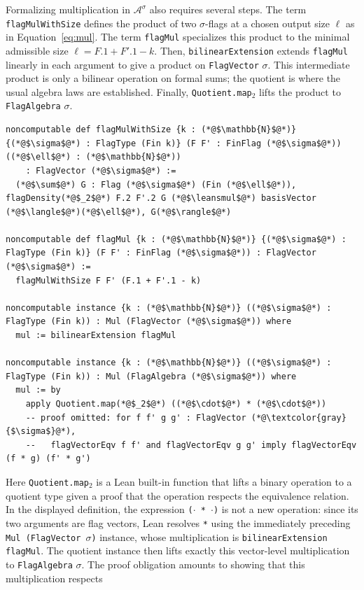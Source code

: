 \documentclass{article}
\newcommand{\lean}[1]{\texttt{#1}}
\newcommand{\leansmul}{\mathbin{\vcenter{\hbox{$\scriptstyle\bullet$}}}}
\begin{document}
Formalizing multiplication in $\mathcal{A}^\sigma$ also requires several steps.
The term \lean{flagMulWithSize} defines the product
of two $\sigma$-flags at a chosen output size $\ell$ as in
Equation~\eqref{eq:mul}. The term \lean{flagMul} specializes this product to the minimal admissible
size $\ell = F.1 + F'.1 - k$. Then, \lean{bilinearExtension} extends
\lean{flagMul} linearly in each argument to give a product on
\lean{FlagVector} $\sigma$.  This intermediate product is only a bilinear
operation on formal sums; the quotient is where the usual algebra laws are
established.  Finally, \lean{Quotient.map$_2$} lifts the product to
\lean{FlagAlgebra} $\sigma$.
\begin{lstlisting}
noncomputable def flagMulWithSize {k : (*@$\mathbb{N}$@*)} {(*@$\sigma$@*) : FlagType (Fin k)} (F F' : FinFlag (*@$\sigma$@*)) ((*@$\ell$@*) : (*@$\mathbb{N}$@*))
    : FlagVector (*@$\sigma$@*) :=
  (*@$\sum$@*) G : Flag (*@$\sigma$@*) (Fin (*@$\ell$@*)), flagDensity(*@$_2$@*) F.2 F'.2 G (*@$\leansmul$@*) basisVector (*@$\langle$@*)(*@$\ell$@*), G(*@$\rangle$@*)

noncomputable def flagMul {k : (*@$\mathbb{N}$@*)} {(*@$\sigma$@*) : FlagType (Fin k)} (F F' : FinFlag (*@$\sigma$@*)) : FlagVector (*@$\sigma$@*) :=
  flagMulWithSize F F' (F.1 + F'.1 - k)

noncomputable instance {k : (*@$\mathbb{N}$@*)} ((*@$\sigma$@*) : FlagType (Fin k)) : Mul (FlagVector (*@$\sigma$@*)) where
  mul := bilinearExtension flagMul

noncomputable instance {k : (*@$\mathbb{N}$@*)} ((*@$\sigma$@*) : FlagType (Fin k)) : Mul (FlagAlgebra (*@$\sigma$@*)) where
  mul := by
    apply Quotient.map(*@$_2$@*) ((*@$\cdot$@*) * (*@$\cdot$@*))
    -- proof omitted: for f f' g g' : FlagVector (*@\textcolor{gray}{$\sigma$}@*),
    --   flagVectorEqv f f' and flagVectorEqv g g' imply flagVectorEqv (f * g) (f' * g')
\end{lstlisting}
Here \lean{Quotient.map$_2$} is a Lean built-in function that lifts a binary
operation to a quotient type given a proof that the operation respects the
equivalence relation.  In the displayed definition, the expression
\lean{($\cdot$ * $\cdot$)} is not a new operation: since its two arguments are
flag vectors, Lean resolves \lean{*} using the immediately preceding
\lean{Mul (FlagVector}~$\sigma$\lean{)} instance, whose multiplication is
\lean{bilinearExtension flagMul}.  The quotient instance then lifts exactly
this vector-level multiplication to \lean{FlagAlgebra} $\sigma$.  The proof
obligation amounts to showing that this multiplication respects
\end{document}
